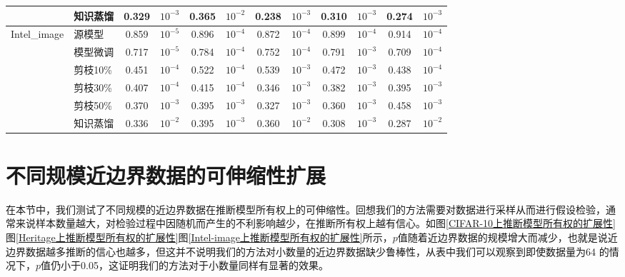 \begin{table}[H]
{\begin{tabular}{l l c c c c c c c c c c}
								&知识蒸馏  & 0.329 & $10^{-3}$ & 0.365 & $10^{-2}$ & 0.238 & $10^{-3}$ & 0.310 & $10^{-3}$ & 0.274 & $10^{-3}$   \\
		\hline
\multirow{6}{5em}{Intel\_image} &源模型    & 0.859 & $10^{-5}$ & 0.896 & $10^{-4}$ & 0.872 & $10^{-4}$ & 0.899 & $10^{-4}$ & 0.914 & $10^{-4}$   \\
								&模型微调  & 0.717 & $10^{-5}$ & 0.784 & $10^{-4}$ & 0.752 & $10^{-4}$ & 0.791 & $10^{-3}$ & 0.709 & $10^{-4}$   \\
								&剪枝10\%  & 0.451 & $10^{-4}$ & 0.522 & $10^{-4}$ & 0.539 & $10^{-3}$ & 0.472 & $10^{-3}$ & 0.438 & $10^{-4}$   \\
								&剪枝30\%  & 0.407 & $10^{-4}$ & 0.415 & $10^{-4}$ & 0.346 & $10^{-3}$ & 0.382 & $10^{-3}$ & 0.395 & $10^{-3}$   \\
								&剪枝50\%  & 0.370 & $10^{-3}$ & 0.395 & $10^{-3}$ & 0.327 & $10^{-3}$ & 0.360 & $10^{-3}$ & 0.458 & $10^{-3}$   \\
								&知识蒸馏  & 0.336 & $10^{-2}$ & 0.395 & $10^{-3}$ & 0.360 & $10^{-2}$ & 0.308 & $10^{-3}$ & 0.287 & $10^{-2}$   \\
		\hline		
	\end{tabular}
}
\end{table}





\section{不同规模近边界数据的可伸缩性扩展}\label{5.6}

在本节中，我们测试了不同规模的近边界数据在推断模型所有权上的可伸缩性。回想我们的方法需要对数据进行采样从而进行假设检验，通常来说样本数量越大，对检验过程中因随机而产生的不利影响越少，在推断所有权上越有信心。如图\ref{CIFAR-10上推断模型所有权的扩展性}图\ref{Heritage上推断模型所有权的扩展性}图\ref{Intel-image上推断模型所有权的扩展性}所示，$p$值随着近边界数据的规模增大而减少，也就是说近边界数据越多推断的信心也越多，但这并不说明我们的方法对小数量的近边界数据缺少鲁棒性，从表中我们可以观察到即使数据量为64 的情况下，$p$值仍小于0.05，这证明我们的方法对于小数量同样有显著的效果。

